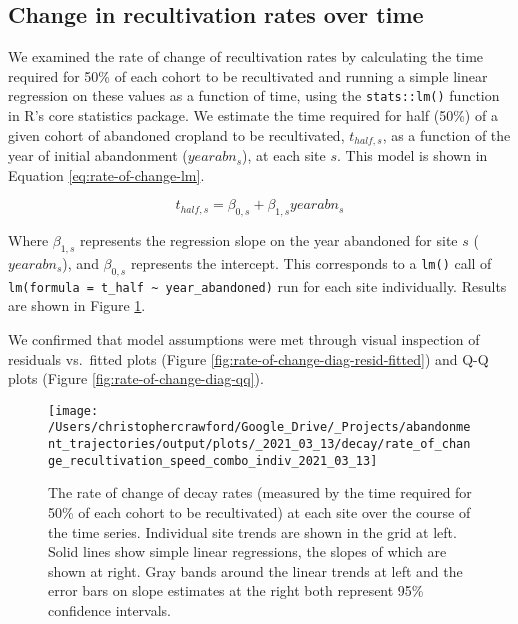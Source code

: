 \documentclass[9pt,twocolumn,twoside,]{pnas-new}
\begin{document}
\newpage

\hypertarget{section-methods-rate-of-change}{%
\subsection{Change in recultivation rates over time}\label{section-methods-rate-of-change}}

We examined the rate of change of recultivation rates by calculating the time required for 50\% of each cohort to be recultivated and running a simple linear regression on these values as a function of time, using the \texttt{stats::lm()} function in R's core statistics package.
We estimate the time required for half (50\%) of a given cohort of abandoned cropland to be recultivated, \(t_{half,s}\), as a function of the year of initial abandonment (\(yearabn_{s}\)), at each site \(s\).
This model is shown in Equation \eqref{eq:rate-of-change-lm}.

\begin{equation}
t_{half,s} = \beta_{0,s} + \beta_{1,s} yearabn_{s} \label{eq:rate-of-change-lm}
\end{equation}

Where \(\beta_{1,s}\) represents the regression slope on the year abandoned for site \(s\) (\(yearabn_{s}\)), and \(\beta_{0,s}\) represents the intercept.
This corresponds to a \texttt{lm()} call of \texttt{lm(formula\ =\ t\_half\ \textasciitilde{}\ year\_abandoned)} run for each site individually.
Results are shown in Figure \ref{fig:decay-rate-of-change}.

We confirmed that model assumptions were met through visual inspection of residuals vs.~fitted plots (Figure \ref{fig:rate-of-change-diag-resid-fitted}) and Q-Q plots (Figure \ref{fig:rate-of-change-diag-qq}).



\begin{figure}
\texttt{[image: /Users/christophercrawford/Google\_Drive/\_Projects/abandonment\_trajectories/output/plots/\_2021\_03\_13/decay/rate\_of\_change\_recultivation\_speed\_combo\_indiv\_2021\_03\_13]} \caption{The rate of change of decay rates (measured by the time required for 50\% of each cohort to be recultivated) at each site over the course of the time series. Individual site trends are shown in the grid at left. Solid lines show simple linear regressions, the slopes of which are shown at right. Gray bands around the linear trends at left and the error bars on slope estimates at the right both represent 95\% confidence intervals.}\label{fig:decay-rate-of-change}
\end{figure}
\end{document}

